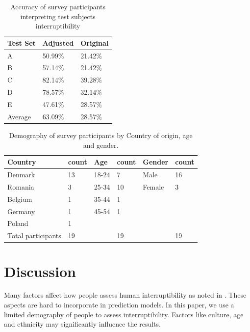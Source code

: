 \documentclass{sigchi}
\begin{document}
\begin{table}[h]
  \centering
  \begin{tabular}{@{}lll@{}}
    \toprule
    Test Set     & Adjusted & Original \\ \midrule
    A       & 50.99\%    & 21.42\%    \\
    B       & 57.14\%    & 21.42\%    \\
    C       & 82.14\%    & 39.28\%    \\
    D       & 78.57\%    & 32.14\%    \\
    E       & 47.61\%    & 28.57\%    \\ \midrule
    Average & 63.09\%    & 28.57\%    \\ \bottomrule
  \end{tabular}
  \caption{Accuracy of survey participants interpreting test subjects interruptibility}
  \label{tab:survey_accuracy}
\end{table}

\begin{table}[h]
  \centering
    \begin{tabular}{@{}llllll@{}}
    \toprule
    \textbf{Country}        & count & \textbf{Age} & count & \textbf{Gender} & count \\ \midrule
    Denmark                 & 13    & 18-24        & 7     & Male            & 16    \\
    Romania                 & 3     & 25-34        & 10    & Female          & 3     \\
    Belgium                 & 1     & 35-44        & 1     &                 &       \\
    Germany                 & 1     & 45-54        & 1     &                 &       \\
    Poland                  & 1     &              &       &                 &       \\
    Total participants      & 19    &              & 19    &                 & 19    \\ \bottomrule
    \end{tabular}
    \caption{Demography of survey participants by Country of origin, age and gender.}
    \label{fig:demography}
\end{table}

\section{Discussion}
Many factors affect how people assess human interruptibility as noted in \cite{Avrahami2007}.
These aspects are hard to incorporate in prediction models.
In this paper, we use a limited demography of people to assess interruptibility.
Factors like culture, age and ethnicity may significantly influence the results.
\end{document}
